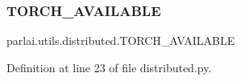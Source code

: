 \subsubsection{\texorpdfstring{T\+O\+R\+C\+H\+\_\+\+A\+V\+A\+I\+L\+A\+B\+LE}{TORCH\_AVAILABLE}}
{\footnotesize\ttfamily parlai.\+utils.\+distributed.\+T\+O\+R\+C\+H\+\_\+\+A\+V\+A\+I\+L\+A\+B\+LE}



Definition at line 23 of file distributed.\+py.

